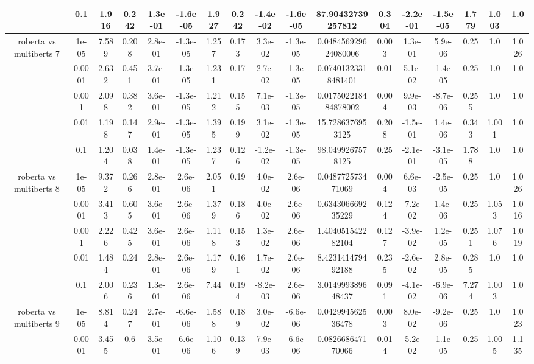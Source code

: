 \begin{tabular}{|c|c|c|c|c|c|c|c|c|c|c|c|c|c|c|c|c|}
 & 0.1 & 1.916 & 0.242 & 1.3e-01 & -1.6e-05 & 1.927 & 0.242 & -1.4e-02 & -1.6e-05 & 87.90432739257812 & 0.304 & -2.2e-01 & -1.5e-05 & 1.779 & 1.003 & 1.0 \\
\hline
\multirow{5}{*}{roberta  vs multiberts 7} & 1e-05 & 7.589 & 0.208 & 2.8e-01 & -1.3e-05 & 1.257 & 0.173 & 3.3e-02 & -1.3e-05 & 0.048456929624080006 & 0.003 & 1.3e-01 & 5.9e-06 & 0.25 & 1.0 & 1.026 \\
 & 0.0001 & 2.632 & 0.451 & 3.7e-01 & -1.3e-05 & 1.231 & 0.17 & 2.7e-02 & -1.3e-05 & 0.07401323318481401 & 0.01 & 5.1e-02 & -1.4e-05 & 0.25 & 1.0 & 1.0 \\
 & 0.001 & 2.098 & 0.382 & 3.6e-01 & -1.3e-05 & 1.212 & 0.155 & 7.1e-03 & -1.3e-05 & 0.017502218484878002 & 0.004 & 9.9e-03 & -8.7e-06 & 0.255 & 1.0 & 1.0 \\
 & 0.01 & 1.198 & 0.147 & 2.9e-01 & -1.3e-05 & 1.395 & 0.199 & 3.1e-02 & -1.3e-05 & 15.7286376953125 & 0.208 & -1.5e-01 & 1.4e-06 & 0.343 & 1.001 & 1.0 \\
 & 0.1 & 1.204 & 0.038 & 1.4e-01 & -1.3e-05 & 1.237 & 0.126 & -1.2e-02 & -1.3e-05 & 98.0499267578125 & 0.25 & -2.1e-01 & -3.1e-05 & 1.788 & 1.0 & 1.0 \\
\hline
\multirow{5}{*}{roberta  vs multiberts 8} & 1e-05 & 9.372 & 0.266 & 2.8e-01 & 2.6e-06 & 2.051 & 0.19 & 4.0e-02 & 2.6e-06 & 0.048772573471069 & 0.004 & 6.6e-03 & -2.5e-05 & 0.25 & 1.0 & 1.026 \\
 & 0.0001 & 3.413 & 0.605 & 3.6e-01 & 2.6e-06 & 1.379 & 0.186 & 4.0e-02 & 2.6e-06 & 0.634306669235229 & 0.124 & -7.2e-02 & 1.4e-06 & 0.25 & 1.053 & 1.016 \\
 & 0.001 & 2.226 & 0.425 & 3.6e-01 & 2.6e-06 & 1.118 & 0.153 & 1.3e-02 & 2.6e-06 & 1.404051542282104 & 0.127 & -3.9e-02 & 1.2e-05 & 0.251 & 1.076 & 1.019 \\
 & 0.01 & 1.484 & 0.24 & 2.8e-01 & 2.6e-06 & 1.179 & 0.161 & 1.7e-02 & 2.6e-06 & 8.423141479492188 & 0.235 & -2.6e-02 & 2.8e-05 & 0.285 & 1.0 & 1.0 \\
 & 0.1 & 2.006 & 0.236 & 1.3e-01 & 2.6e-06 & 7.44 & 0.194 & -8.2e-03 & 2.6e-06 & 3.014999389648437 & 0.091 & -4.1e-02 & -6.9e-06 & 7.274 & 1.003 & 1.0 \\
\hline
\multirow{5}{*}{roberta  vs multiberts 9} & 1e-05 & 8.814 & 0.247 & 2.7e-01 & -6.6e-06 & 1.588 & 0.189 & 3.0e-02 & -6.6e-06 & 0.042994562536478 & 0.003 & 8.0e-02 & -9.2e-06 & 0.25 & 1.0 & 1.023 \\
 & 0.0001 & 3.455 & 0.6 & 3.5e-01 & -6.6e-06 & 1.106 & 0.139 & 7.9e-03 & -6.6e-06 & 0.082668647170066 & 0.014 & -5.2e-02 & -1.1e-05 & 0.25 & 1.005 & 1.135 \\

\end{tabular}

